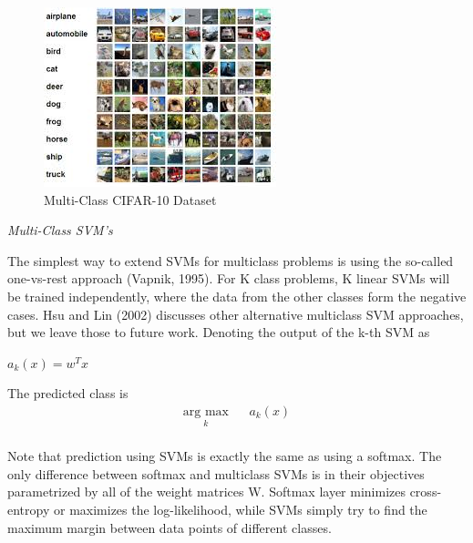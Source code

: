 \documentclass[preprint,12pt]{elsarticle}
\begin{document}
\begin{figure}[h]
\centering\includegraphics[width=0.8\linewidth]{cifar}
\caption{Multi-Class CIFAR-10 Dataset}
\end{figure}
\textit{Multi-Class SVM's}

The simplest way to extend SVMs for multiclass problems
is using the so-called one-vs-rest approach (Vapnik,
1995). For K class problems, K linear SVMs
will be trained independently, where the data from
the other classes form the negative cases. Hsu and Lin
(2002) discusses other alternative multiclass SVM approaches,
but we leave those to future work.
Denoting the output of the k-th SVM as \\

\begin{center}$a_k(x)=w^Tx$ \\
\end{center}

The predicted class is\\

\begin{equation*}
\begin{aligned}
 \underset{k}{\text{arg max}}
 & & a_k(x)\\
\end{aligned}
\end{equation*}


Note that prediction using SVMs is exactly the same
as using a softmax. The only difference between
softmax and multiclass SVMs is in their objectives
parametrized by all of the weight matrices W. Softmax
layer minimizes cross-entropy or maximizes the
log-likelihood, while SVMs simply try to find the maximum
margin between data points of different classes.\\
\end{document}
